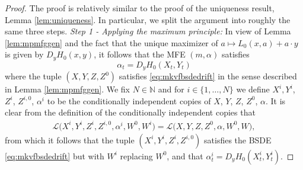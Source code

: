 \documentclass[11pt,reqno]{amsart}
\numberwithin{equation}{section}
\theoremstyle{definition}
\def\N{{\mathbb N}}
\newcommand{\sL}{\mathcal{L}}
\def \N{\mathbb{N}}
\begin{document}
\begin{proof}


The proof is relatively similar to the proof of the uniqueness result, Lemma \ref{lem:uniqueness}. In particular, we split the argument into roughly the same three steps.
\newline \newline \noindent
\textit{Step 1 - Applying the maximum principle:}
In view of Lemma \ref{lem:mpmfggen} and the fact that the unique maximizer of $a \mapsto L_0(x,a) + a\cdot y$ is given by $D_yH_0(x,y)$, it follows that the MFE $(m,\alpha)$ satisfies
\begin{equation*}
  \alpha_t = D_yH_0(X_t, Y_t)
 \end{equation*} 
 where the tuple $(X,Y,Z,Z^{0}) $ satisfies \eqref{eq:mkvfbsdedrift}
in the sense described in Lemma \ref{lem:mpmfggen}. We fix $N \in \N$ and for $i \in \{1,\dots,N\}$ we define $X^i, Y^i$, $Z^i$, $Z^{i,0}$, $\alpha^i$ to be the conditionally independent copies of $X$, $Y$, $Z$, $Z^0$, $\alpha$. It is clear from the definition of the conditionally independent copies that 
\begin{align*}
\sL\Big(X^i,Y^i,Z^i,Z^{i,0}, \alpha^i, W^0,W^i \Big) = \sL\Big(X,Y,Z,Z^0, \alpha, W^0,W \Big), 
\end{align*}
from which it follows that the tuple $(X^i,Y^i,Z^i,Z^{i,0})$ satisfies the BSDE \eqref{eq:mkvfbsdedrift} but with $W^i$ replacing $W^0$, and that $\alpha_t^i = D_y H_0(X_t^i, Y_t^i)$.


\end{proof}
\end{document}

